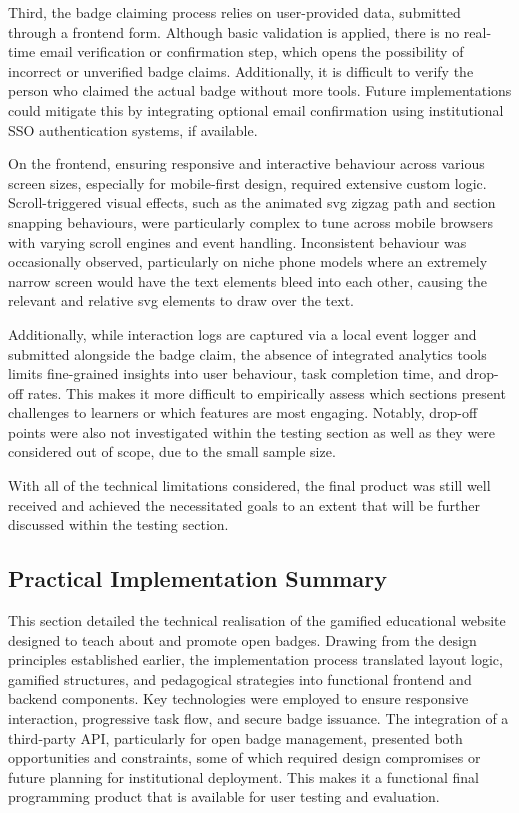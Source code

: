 Third, the badge claiming process relies on user-provided data, submitted through a frontend form. 
Although basic validation is applied, there is no real-time email verification or confirmation step, which opens the possibility of incorrect or unverified badge claims. 
Additionally, it is difficult to verify the person who claimed the actual badge without more tools. Future implementations could mitigate this by integrating optional email confirmation using institutional SSO authentication systems, if available.

On the frontend, ensuring responsive and interactive behaviour across various screen sizes, especially for mobile-first design, required extensive custom logic. 
Scroll-triggered visual effects, such as the animated \acrshort{svg} zigzag path and section snapping behaviours, were particularly complex to tune across mobile browsers with varying scroll engines and event handling. 
Inconsistent behaviour was occasionally observed, particularly on niche phone models where an extremely narrow screen would have the text elements bleed into each other, causing the relevant and relative \acrshort{svg} elements to draw over the text.

Additionally, while interaction logs are captured via a local event logger and submitted alongside the badge claim, the absence of integrated analytics tools limits fine-grained insights into user behaviour, task completion time, and drop-off rates. 
This makes it more difficult to empirically assess which sections present challenges to learners or which features are most engaging. 
Notably, drop-off points were also not investigated within the testing section as well as they were considered out of scope, due to the small sample size.

With all of the technical limitations considered, the final product was still well received and achieved the necessitated goals to an extent that will be further discussed within the testing section.

\subsection{Practical Implementation Summary}
This section detailed the technical realisation of the gamified educational website designed to teach about and promote open badges. 
Drawing from the design principles established earlier, the implementation process translated layout logic, gamified structures, and pedagogical strategies into functional frontend and backend components. 
Key technologies were employed to ensure responsive interaction, progressive task flow, and secure badge issuance. 
The integration of a third-party API, particularly for open badge management, presented both opportunities and constraints, some of which required design compromises or future planning for institutional deployment. 
This makes it a functional final programming product that is available for user testing and evaluation.
\newpage